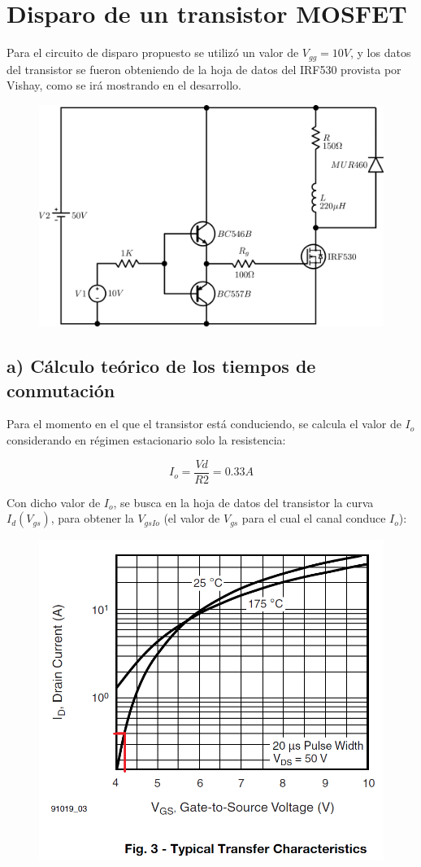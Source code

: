 \documentclass[e4_tp1_main.tex]{subfiles}
\begin{document}
\section{Disparo de un transistor MOSFET}

Para el circuito de disparo propuesto se utilizó un valor de $V_{gg}=10V$, y los datos del transistor se fueron obteniendo de la hoja de datos del IRF530 provista por Vishay, como se irá mostrando en el desarrollo.

\begin{figure}[H]
\centering
\includegraphics[width=0.6\linewidth]{Imagenes/Punto1/CircuitoDisparo.png}
\end{figure}

\subsection*{a) Cálculo teórico de los tiempos de conmutación}

Para el momento en el que el transistor está conduciendo, se calcula el valor de $I_o$ considerando en régimen estacionario solo la resistencia:

\[
I_o = \frac{Vd}{R2} = 0.33A
\]

Con dicho valor de $I_o$, se busca en la hoja de datos del transistor la curva $I_d(V_{gs})$, para obtener la $V_{gsIo}$ (el valor de $V_{gs}$ para el cual el canal conduce $I_o$):

\begin{figure}[H]
\centering
\includegraphics[width=0.5\linewidth]{Imagenes/Punto1/Ej1-VgsIo.png}
\end{figure}
\end{document}
